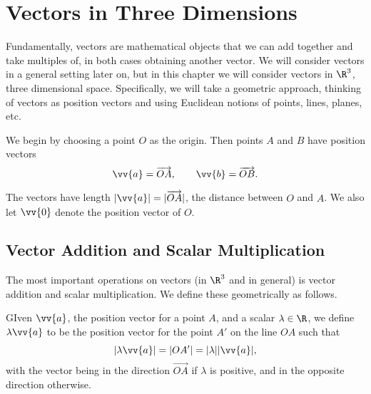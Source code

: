 
\chapter{Vectors in Three Dimensions}

Fundamentally, vectors are mathematical objects that we can add together and take multiples of, in both cases obtaining another vector. We will consider vectors in a general setting later on, but in this chapter we will consider vectors in $\R^3$, three dimensional space. Specifically, we will take a geometric approach, thinking of vectors as position vectors and using Euclidean notions of points, lines, planes, etc.

We begin by choosing a point $O$ as the origin. Then points $A$ and $B$ have position vectors
$$
\vv{a} = \overrightarrow{OA}, \quad\quad \vv{b} = \overrightarrow{OB}.
$$

\begin{center}
\end{center}

The vectors have length $|\vv{a}| = |\overrightarrow{OA}|$, the distance between $O$ and $A$. We also let $\vv{0}$ denote the position vector of $O$.

\section{Vector Addition and Scalar Multiplication}

The most important operations on vectors (in $\R^3$ and in general) is vector addition and scalar multiplication. We define these geometrically as follows.

\begin{definition}
	GIven $\vv{a}$, the position vector for a point $A$, and a scalar $\lambda \in \R$, we define  $\lambda \vv{a}$ to be the position vector for the point $A'$ on the line $OA$ such that
	$$
	|\lambda \vv{a} | = |OA'| = |\lambda| |\vv{a}|,
	$$
	with the vector being in the direction $\overrightarrow{OA}$ if $\lambda$ is positive, and in the opposite direction otherwise.
\end{definition}

